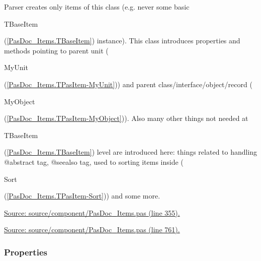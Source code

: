 \documentclass{report}
\begin{document}
Parser creates only items of this class (e.g. never some basic \begin{ttfamily}TBaseItem\end{ttfamily}(\ref{PasDoc_Items.TBaseItem}) instance). This class introduces properties and methods pointing to parent unit (\begin{ttfamily}MyUnit\end{ttfamily}(\ref{PasDoc_Items.TPasItem-MyUnit})) and parent class/interface/object/record (\begin{ttfamily}MyObject\end{ttfamily}(\ref{PasDoc_Items.TPasItem-MyObject})). Also many other things not needed at \begin{ttfamily}TBaseItem\end{ttfamily}(\ref{PasDoc_Items.TBaseItem}) level are introduced here: things related to handling @abstract tag, @seealso tag, used to sorting items inside (\begin{ttfamily}Sort\end{ttfamily}(\ref{PasDoc_Items.TPasItem-Sort})) and some more.\par
\href{https://github.com/pasdoc/pasdoc/blob/master/source/component/PasDoc_Items.pas#L355}{Source: source/component/PasDoc{\_}Items.pas (line 355).}\par
\href{https://github.com/pasdoc/pasdoc/blob/master/source/component/PasDoc_Items.pas#L761}{Source: source/component/PasDoc{\_}Items.pas (line 761).}\subsubsection*{\large{\textbf{Properties}}\normalsize\hspace{1ex}\hfill}
\end{document}
